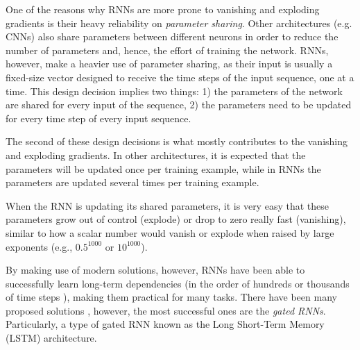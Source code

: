 One of the reasons why RNNs are more prone to vanishing and
exploding gradients is their heavy reliability on
\emph{parameter sharing}. Other architectures (e.g. CNNs)
also share parameters between different neurons in order to
reduce the number of parameters and, hence, the effort of
training the network. RNNs, however, make a heavier use of
parameter sharing, as their input is usually a fixed-size
vector designed to receive the time steps of the input
sequence, one at a time. This design decision implies two
things: 1) the parameters of the network are shared for
every input of the sequence, 2) the parameters need to be
updated for every time step of every input sequence.

The second of these design decisions is what mostly
contributes to the vanishing and exploding gradients. In
other architectures, it is expected that the parameters will
be updated once per training example, while in RNNs the
parameters are updated several times per training example.

When the RNN is updating its shared parameters, it is very
easy that these parameters grow out of control (explode) or
drop to zero really fast (vanishing), similar to how a
scalar number would vanish or explode when raised by
large exponents (e.g., $0.5^{1000}$ or $10^{1000}$).

By making use of modern solutions, however, RNNs have been
able to successfully learn long-term dependencies (in the
order of hundreds or thousands of time steps
\parencite{hochreiter1997long}), making them practical for
many tasks. There have been many proposed solutions
\parencite{elhihi1995hierarchical, yildiz2012revisiting,
jaeger2012long}, however, the most successful ones are the
\emph{gated RNNs}. Particularly, a type of gated RNN known
as the Long Short-Term Memory (LSTM) architecture.
